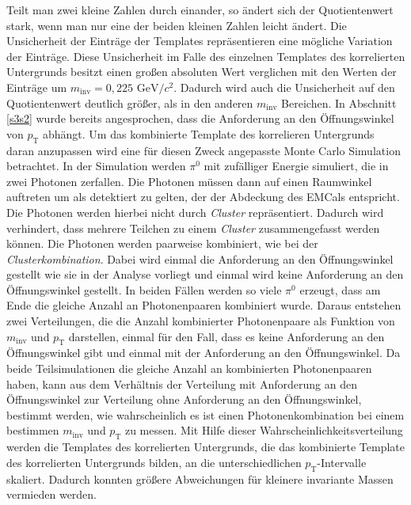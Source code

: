 Teilt man zwei kleine Zahlen durch einander, so ändert sich der Quotientenwert stark, wenn man nur eine der beiden kleinen Zahlen leicht ändert.
Die Unsicherheit der Einträge der Templates repräsentieren eine mögliche Variation der Einträge.
Diese Unsicherheit im Falle des einzelnen Templates des korrelierten Untergrunds besitzt einen großen absoluten Wert verglichen mit den Werten der Einträge um $m_\text{inv} = 0,225\text{ GeV}/c^{2}$.
Dadurch wird auch die Unsicherheit auf den Quotientenwert deutlich größer, als in den anderen $m_\text{inv}$ Bereichen.
\newline
In Abschnitt \ref{s3s2} wurde bereits angesprochen, dass die Anforderung an den Öffnungswinkel von $p_\text{T}$ abhängt.
Um das kombinierte Template des korrelieren Untergrunds daran anzupassen wird eine für diesen Zweck angepasste Monte Carlo Simulation betrachtet.
In der Simulation werden $\pi^{0}$ mit zufälliger Energie simuliert, die in zwei Photonen zerfallen.
Die Photonen müssen dann auf einen Raumwinkel auftreten um als detektiert zu gelten, der der Abdeckung des EMCals entspricht.
Die Photonen werden hierbei nicht durch \textit{Cluster} repräsentiert.
Dadurch wird verhindert, dass mehrere Teilchen zu einem \textit{Cluster} zusammengefasst werden können.
Die Photonen werden paarweise kombiniert, wie bei der \textit{Clusterkombination}.
Dabei wird einmal die Anforderung an den Öffnungswinkel gestellt wie sie in der Analyse vorliegt und einmal wird keine Anforderung an den Öffnungswinkel gestellt.
In beiden Fällen werden so viele $\pi^{0}$ erzeugt, dass am Ende die gleiche Anzahl an Photonenpaaren kombiniert wurde.
Daraus entstehen zwei Verteilungen, die die Anzahl kombinierter Photonenpaare als Funktion von $m_\text{inv}$ und $p_\text{T}$ darstellen, einmal für den Fall, dass es keine Anforderung an den Öffnungswinkel gibt und einmal mit der Anforderung an den Öffnungswinkel.
Da beide Teilsimulationen die gleiche Anzahl an kombinierten Photonenpaaren haben, kann aus dem Verhältnis der Verteilung mit Anforderung an den Öffnungswinkel zur Verteilung ohne Anforderung an den Öffnungswinkel, bestimmt werden, wie wahrscheinlich es ist einen Photonenkombination bei einem bestimmen $m_\text{inv}$ und $p_\text{T}$ zu messen.
Mit Hilfe dieser Wahrscheinlichkeitsverteilung werden die Templates des korrelierten Untergrunds, die das kombinierte Template des korrelierten Untergrunds bilden, an die unterschiedlichen $p_\text{T}$-Intervalle skaliert.
Dadurch konnten größere Abweichungen für kleinere invariante Massen vermieden werden.
\newline
